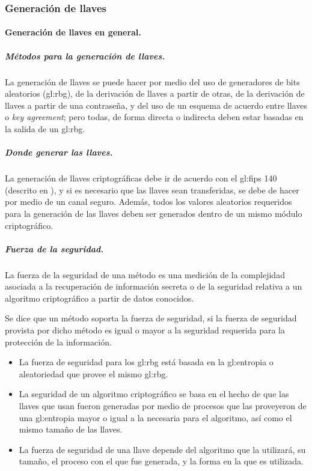 %
%

\subsubsection{Generación de llaves}
\label{sec:generacion_llaves}


\paragraph{Generación de llaves en general.}

\subparagraph{Métodos para la generación de llaves.}
La generación de llaves se puede hacer por medio del uso de generadores de 
bits aleatorios (\gls{gl:rbg}), de la derivación de llaves a partir de otras, 
de la derivación de llaves a partir de una contraseña, y del uso de un esquema 
de acuerdo entre llaves o \textit{key agreement}; pero todas, de forma directa 
o indirecta deben estar basadas en la salida de un \gls{gl:rbg}.

\subparagraph{Donde generar las llaves.}
La generación de llaves criptográficas debe ir de acuerdo con el \gls{gl:fips} 
140 (descrito en \cite{nist_modulos_criptograficos}), y si es necesario que 
las llaves sean transferidas, se debe de hacer por medio de un canal seguro. 
Además, todos los valores aleatorios requeridos para la generación de las 
llaves deben ser generados dentro de un mismo módulo criptográfico.

\subparagraph{Fuerza de la seguridad.}
La fuerza de la seguridad de una método es una medición de la complejidad 
asociada a la recuperación de información secreta o de la seguridad relativa 
a un algoritmo criptográfico a partir de datos conocidos.

Se dice que un método soporta la fuerza de seguridad, si la fuerza de 
seguridad provista por dicho método es igual o mayor a la seguridad 
requerida para la protección de la información.
\begin{itemize}

  \item La fuerza de seguridad para los \gls{gl:rbg} está basada en la 
    \gls{gl:entropia} o aleatoriedad que provee el mismo \gls{gl:rbg}.

  \item La seguridad de un algoritmo criptográfico se basa en el hecho de 
    que las llaves que usan fueron generadas por medio de procesos que las 
    proveyeron de una \gls{gl:entropia} mayor o igual a la necesaria para el 
    algoritmo, así como el mismo tamaño de las llaves.

  \item La fuerza de seguridad de una llave depende del algoritmo que la 
    utilizará, su tamaño, el proceso con el que fue generada, y la forma en 
    la que es utilizada.

\end{itemize}

